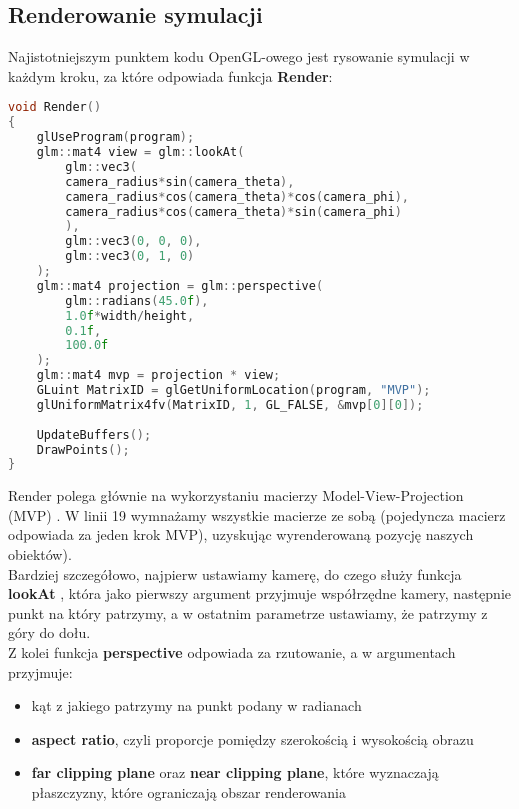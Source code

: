 \documentclass[14pt,twoside,a4paper]{article}
\theoremstyle{definition}
\begin{document}
\subsection{\large Renderowanie symulacji}

Najistotniejszym punktem kodu OpenGL-owego jest rysowanie symulacji w każdym kroku, za które odpowiada funkcja \textbf{Render}:
\begin{lstlisting}[language=C++, frame=single, framerule=2pt, caption=Pseudokod renderowania symulacji]
void Render() 
{
    glUseProgram(program);
    glm::mat4 view = glm::lookAt(
        glm::vec3(
        camera_radius*sin(camera_theta),
        camera_radius*cos(camera_theta)*cos(camera_phi),
        camera_radius*cos(camera_theta)*sin(camera_phi)
        ),
        glm::vec3(0, 0, 0),
        glm::vec3(0, 1, 0)
    );
    glm::mat4 projection = glm::perspective(
        glm::radians(45.0f),
        1.0f*width/height,
        0.1f,
        100.0f
    );
    glm::mat4 mvp = projection * view;
    GLuint MatrixID = glGetUniformLocation(program, "MVP");
    glUniformMatrix4fv(MatrixID, 1, GL_FALSE, &mvp[0][0]);
    
    UpdateBuffers();
    DrawPoints();
}
\end{lstlisting}
\bigskip

Render polega głównie na wykorzystaniu macierzy Model-View-Projection (MVP) \cite{tutMat}. 
W linii 19 wymnażamy wszystkie macierze ze sobą (pojedyncza macierz odpowiada za jeden krok MVP), uzyskując wyrenderowaną pozycję naszych obiektów).\\

Bardziej szczegółowo, najpierw ustawiamy kamerę, do czego służy funkcja \textbf{lookAt} \cite{opengl}, która jako pierwszy argument przyjmuje współrzędne kamery, następnie punkt na który patrzymy, a w ostatnim parametrze ustawiamy, że patrzymy z góry do dołu.\\
Z kolei funkcja \textbf{perspective} \cite{opengl} odpowiada za rzutowanie, a w argumentach przyjmuje:
\begin{itemize}
\item kąt z jakiego patrzymy na punkt podany w radianach
\item \textbf{aspect ratio}, czyli proporcje pomiędzy szerokością i wysokością obrazu
\item \textbf{far clipping plane} oraz \textbf{near clipping plane}, które wyznaczają płaszczyzny, które ograniczają obszar renderowania
\end{itemize} 
\end{document}
